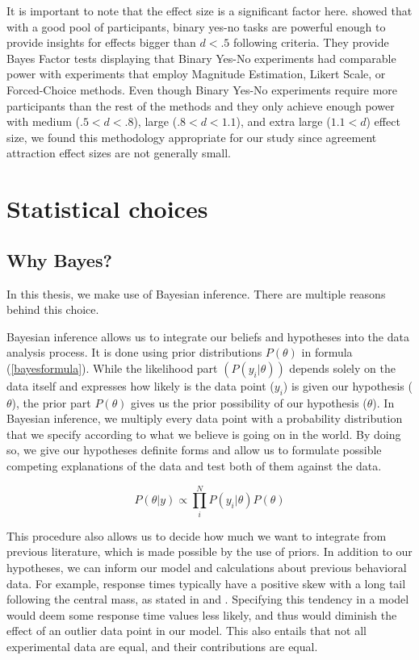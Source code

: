 It is important to note that the effect size is a significant factor here.  showed that with a good pool of participants, binary yes-no tasks are powerful enough to provide insights for effects bigger than $d<.5$ following \cites{Cohen92} criteria. They provide Bayes Factor tests displaying that Binary Yes-No experiments had comparable power with experiments that employ Magnitude Estimation, Likert Scale, or Forced-Choice methods. Even though Binary Yes-No experiments require more participants than the rest of the methods and they only achieve enough power with medium ($.5<d<.8$), large ($.8<d<1.1$), and extra large ($1.1<d$) effect size, we found this methodology appropriate for our study since agreement attraction effect sizes are not generally small.


\section{Statistical choices}

\subsection{Why Bayes?}

In this thesis, we make use of Bayesian inference. There are multiple reasons behind this choice. 

Bayesian inference allows us to integrate our beliefs and hypotheses into the data analysis process. It is done using prior distributions $P(\theta)$ in formula (\ref{bayesformula}). While the likelihood part $(P(y_{i}|\theta))$ depends solely on the data itself and expresses how likely is the data point ($y_{i}$) is given our hypothesis ($\theta$), the prior part $P(\theta)$ gives us the prior possibility of our hypothesis ($\theta$). In Bayesian inference, we multiply every data point with a probability distribution that we specify according to what we believe is going on in the world. By doing so, we give our hypotheses definite forms and allow us to formulate possible competing explanations of the data and test both of them against the data. 

\begin{equation}\label{bayesformula}
  P(\theta|y) \propto \prod_{i}^{N} P(y_{i}|\theta) P(\theta)
\end{equation}


This procedure also allows us to decide how much we want to integrate from previous literature, which is made possible by the use of priors. In addition to our hypotheses, we can inform our model and calculations about previous behavioral data. For example, response times typically have a positive skew with a long tail following the central mass, as stated in  and . Specifying this tendency in a model would deem some response time values less likely, and thus would diminish the effect of an outlier data point in our model. This also entails that not all experimental data are equal, and their contributions are equal. 

